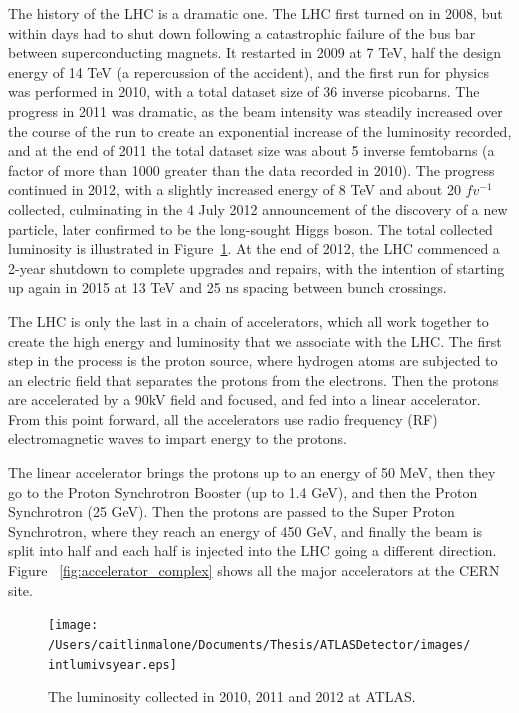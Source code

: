 The history of the LHC is a dramatic one.  The LHC first turned on in 2008, but within days had to shut down following a catastrophic failure of the bus bar between superconducting magnets.  It restarted in 2009 at 7 TeV, half the design energy of 14 TeV (a repercussion of the accident), and the first run for physics was performed in 2010, with a total dataset size of 36 inverse picobarns.  The progress in 2011 was dramatic, as the beam intensity was steadily increased over the course of the run to create an exponential increase of the luminosity recorded, and at the end of 2011 the total dataset size was about 5 inverse femtobarns (a factor of more than 1000 greater than the data recorded in 2010).  The progress continued in 2012, with a slightly increased energy of 8 TeV and about 20 $fv^{-1}$ collected, culminating in the 4 July 2012 announcement of the discovery of a new particle, later confirmed to be the long-sought Higgs boson.  The total collected luminosity is illustrated in Figure~\ref{fig:lumi_vs_year}.  At the end of 2012, the LHC commenced a 2-year shutdown to complete upgrades and repairs, with the intention of starting up again in 2015 at 13 TeV and 25 ns spacing between bunch crossings.


The LHC is only the last in a chain of accelerators, which all work together to create the high energy and luminosity that we associate with the LHC.  The first step in the process is the proton source, where hydrogen atoms are subjected to an electric field that separates the protons from the electrons.  Then the protons are accelerated by a 90kV field and focused, and fed into a linear accelerator.  From this point forward, all the accelerators use radio frequency (RF) electromagnetic waves to impart energy to the protons.  

The linear accelerator brings the protons up to an energy of 50 MeV, then they go to the Proton Synchrotron Booster (up to 1.4 GeV), and then the Proton Synchrotron (25 GeV).  Then the protons are passed to the Super Proton Synchrotron, where they reach an energy of 450 GeV, and finally the beam is split into half and each half is injected into the LHC going a different direction.  Figure ~\ref{fig:accelerator_complex} shows all the major accelerators at the CERN site.


\begin{figure}
	\centering
	\texttt{[image: /Users/caitlinmalone/Documents/Thesis/ATLASDetector/images/intlumivsyear.eps]}
	\caption{The luminosity collected in 2010, 2011 and 2012 at ATLAS. \label{fig:lumi_vs_year}}
\end{figure}


